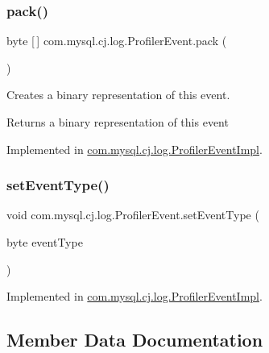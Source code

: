 \subsubsection{\texorpdfstring{pack()}{pack()}}
{\footnotesize\ttfamily byte \mbox{[}$\,$\mbox{]} com.\+mysql.\+cj.\+log.\+Profiler\+Event.\+pack (\begin{DoxyParamCaption}{ }\end{DoxyParamCaption})}

Creates a binary representation of this event.

\begin{DoxyReturn}{Returns}
a binary representation of this event 
\end{DoxyReturn}


Implemented in \mbox{\hyperlink{classcom_1_1mysql_1_1cj_1_1log_1_1_profiler_event_impl_a5586e172eb7af1a0374145d8afba72ba}{com.\+mysql.\+cj.\+log.\+Profiler\+Event\+Impl}}.

\mbox{\label{interfacecom_1_1mysql_1_1cj_1_1log_1_1_profiler_event_a9d335a56c66afa440fce845f973e759e}} 
\subsubsection{\texorpdfstring{set\+Event\+Type()}{setEventType()}}
{\footnotesize\ttfamily void com.\+mysql.\+cj.\+log.\+Profiler\+Event.\+set\+Event\+Type (\begin{DoxyParamCaption}\item[{byte}]{event\+Type }\end{DoxyParamCaption})}



Implemented in \mbox{\hyperlink{classcom_1_1mysql_1_1cj_1_1log_1_1_profiler_event_impl_a1326d8fa5e3acbe79a145469f7316843}{com.\+mysql.\+cj.\+log.\+Profiler\+Event\+Impl}}.



\subsection{Member Data Documentation}
\mbox{\label{interfacecom_1_1mysql_1_1cj_1_1log_1_1_profiler_event_aedf5d4b8edd977d032ecc2b3691568fb}} 
